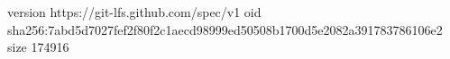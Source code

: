 version https://git-lfs.github.com/spec/v1
oid sha256:7abd5d7027fef2f80f2c1aecd98999ed50508b1700d5e2082a391783786106e2
size 174916
